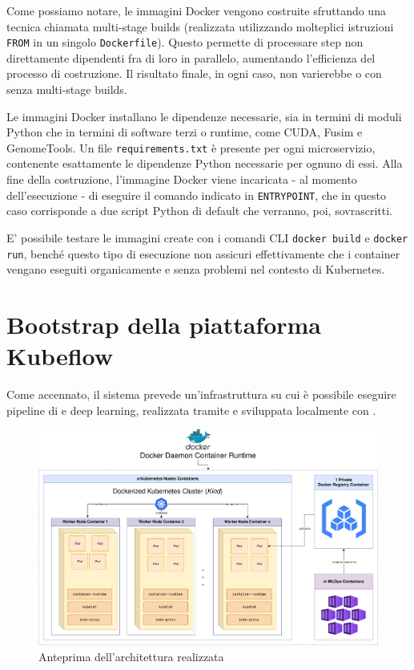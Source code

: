 Come possiamo notare, le immagini Docker vengono costruite sfruttando una tecnica chiamata multi-stage builds (realizzata utilizzando molteplici istruzioni {\small \verb|FROM|} in un singolo {\small \verb|Dockerfile|}). Questo permette di processare step non direttamente dipendenti fra di loro in parallelo, aumentando l'efficienza del processo di costruzione. Il risultato finale, in ogni caso, non varierebbe o con senza multi-stage builds.

Le immagini Docker installano le dipendenze necessarie, sia in termini di moduli Python che in termini di software terzi o runtime, come CUDA, Fusim e GenomeTools. Un file {\small \verb|requirements.txt|} è presente per ogni microservizio, contenente esattamente le dipendenze Python necessarie per ognuno di essi. Alla fine della costruzione, l'immagine Docker viene incaricata - al momento dell'esecuzione - di eseguire il comando indicato in {\small \verb|ENTRYPOINT|}, che in questo caso corrisponde a due script Python di default che verranno, poi, sovrascritti.

E' possibile testare le immagini create con i comandi CLI {\small \verb|docker build|} e {\small \verb|docker run|}, benché questo tipo di esecuzione non assicuri effettivamente che i container vengano eseguiti organicamente e senza problemi nel contesto di Kubernetes.

\section{Bootstrap della piattaforma Kubeflow}

Come accennato, il sistema prevede un'infrastruttura  su cui è possibile eseguire pipeline di  e deep learning, realizzata tramite  e sviluppata localmente con .

\begin{figure}[h]
    \centering
    \includegraphics[width=\linewidth]{figures/ch4and5/arch.png}
    \caption[Anteprima dell'architettura realizzata]{Anteprima dell'architettura realizzata}
    \label{fig:cha6:arch}
\end{figure}

